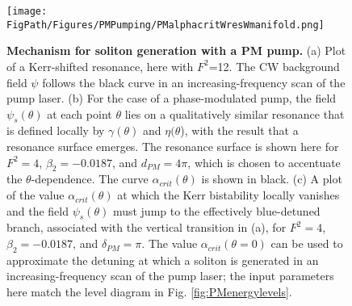 \begin{figure}[htpb]
	\begin{center}
		\texttt{[image: \\FigPath/Figures/PMPumping/PMalphacritWresWmanifold.png]}
	\end{center}
	\caption[Mechanism for soliton generation with a PM pump]{\textbf{Mechanism for soliton generation with a PM pump.} (a) Plot of a Kerr-shifted resonance, here with $F^2$=12. The CW background field $\psi$ follows the black curve in an increasing-frequency scan of the pump laser. (b) For the case of a phase-modulated pump, the field $\psi_s(\theta)$ at each point $\theta$ lies on a qualitatively similar resonance that is defined locally by $\gamma(\theta)$ and $\eta(\theta$), with the result that a resonance surface emerges. The resonance surface is shown here for $F^2=4$, $\beta_2=-0.0187$, and $d_{PM}=4\pi$, which is chosen to accentuate the $\theta$-dependence. The curve $\alpha_{crit}(\theta)$ is shown in black. (c) A plot of the value $\alpha_{crit}(\theta)$ at which the Kerr bistability locally vanishes and the field $\psi_s(\theta)$ must jump to the effectively blue-detuned branch, associated with the vertical transition in (a), for $F^2=4$, $\beta_2=-0.0187$, and $\delta_{PM}=\pi$. The value $\alpha_{crit}(\theta=0)$ can be used to approximate the detuning at which a soliton is generated in an increasing-frequency scan of the pump laser; the input parameters here match the level diagram in Fig. \ref{fig:PMenergylevels}.}
	\label{fig:PMalphacrit}
\end{figure} 

